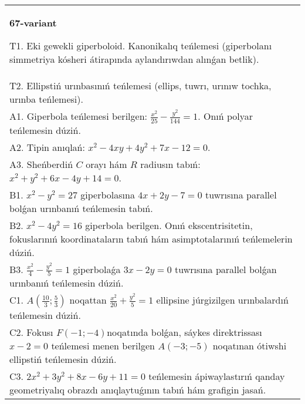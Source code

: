 \documentclass{article}
\begin{document}
\begin{tabular}{m{17cm}}
\textbf{67-variant}
\newline

T1. Eki gewekli giperboloid. Kanonikalıq teńlemesi (giperbolanı simmetriya kósheri átirapında aylandırıwdan alınǵan betlik).\\

T2. Ellipstiń urınbasınıń teńlemesi (ellips, tuwrı, urınıw tochka, urınba teńlemesi).\\

A1. Giperbola teńlemesi berilgen: $\frac{x^{2}}{25}-\frac{y^{2}}{144}=1$. Onıń polyar teńlemesin dúziń.\\

A2. Tipin anıqlań: $x^{2}-4 xy+4 y^{2}+7 x-12=0$.\\

A3. Sheńberdiń $C$ orayı hám $R$ radiusın tabıń: $x^2+y^2+6 x-4 y+14=0$.\\

B1. $x^{2} - y^{2} = 27$ giperbolasına $4x + 2y - 7 = 0$ tuwrısına parallel bolǵan urınbanıń teńlemesin tabıń.  \\

B2. $x^{2} - 4y^{2} = 16$ giperbola berilgen. Onıń ekscentrisitetin, fokuslarınıń koordinataların tabıń hám asimptotalarınıń teńlemelerin dúziń.\\

B3. $\frac{x^{2}}{4} - \frac{y^{2}}{5} = 1$ giperbolaǵa $3x - 2y = 0$ tuwrısına parallel bolǵan urınbanıń teńlemesin dúziń.  \\

C1. $A(\frac{10}{3};\frac{5}{3})$ noqattan $\frac{x^{2}}{20} + \frac{y^{2}}{5} = 1$ ellipsine júrgizilgen urınbalardıń teńlemesin dúziń.  \\

C2. Fokusı $F( - 1; - 4)$noqatında bolǵan, sáykes direktrissası $x - 2 = 0$ teńlemesi menen berilgen $A( - 3; - 5)$ noqatınan ótiwshi ellipstiń teńlemesin dúziń.  \\

C3. $2x^{2} + 3y^{2} + 8x - 6y + 11 = 0$ teńlemesin ápiwaylastırıń qanday geometriyalıq obrazdı anıqlaytuǵının tabıń hám grafigin jasań.  \\

\end{tabular}
\vspace{1cm}
\end{document}
